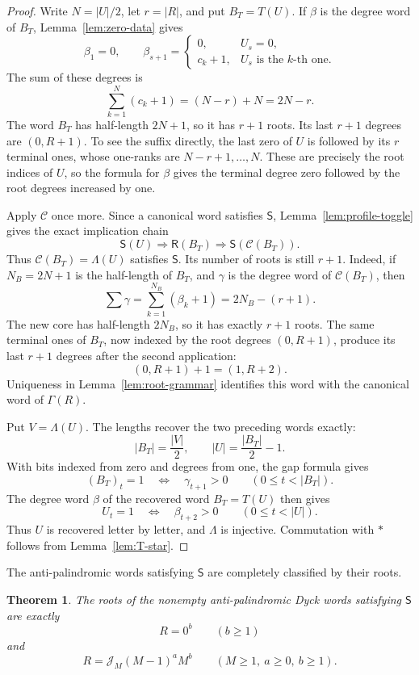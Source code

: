 \documentclass[11pt]{article}
\newtheorem{theorem}{Theorem}[section]
\theoremstyle{definition}
\theoremstyle{remark}
\newcommand{\Star}{*}
\newcommand{\Lam}{\Lambda}
\begin{document}
\begin{proof}
Write \(N=|U|/2\), let \(r=|R|\), and put \(B_T=T(U)\).  If
\(\beta\) is the degree word of \(B_T\), Lemma~\ref{lem:zero-data} gives
\[
 \beta_1=0,
 \qquad
 \beta_{s+1}=
 \begin{cases}
 0,&U_s=0,\\
 c_k+1,&U_s\text{ is the }k\text{-th one}.
 \end{cases}
\]
The sum of these degrees is
\[
 \sum_{k=1}^N(c_k+1)=(N-r)+N=2N-r.
\]
The word \(B_T\) has half-length \(2N+1\), so it has \(r+1\) roots.  Its
last \(r+1\) degrees are \((0,R+1)\).  To see the suffix directly, the last
zero of \(U\) is followed by its \(r\) terminal ones, whose one-ranks are
\(N-r+1,\ldots,N\).  These are precisely the root indices of \(U\), so the
formula for \(\beta\) gives the terminal degree zero followed by the root
degrees increased by one.

Apply \(\mathcal C\) once more.  Since a canonical word satisfies
\(\mathsf S\), Lemma~\ref{lem:profile-toggle} gives the exact implication
chain
\[
 \mathsf S(U)\Longrightarrow\mathsf R(B_T)
 \Longrightarrow\mathsf S(\mathcal C(B_T)).
\]
Thus \(\mathcal C(B_T)=\Lam(U)\) satisfies \(\mathsf S\).  Its number of roots is
still \(r+1\).  Indeed, if \(N_B=2N+1\) is the half-length of \(B_T\), and
\(\gamma\) is the degree word of \(\mathcal C(B_T)\), then
\[
 \sum\gamma=\sum_{k=1}^{N_B}(\beta_k+1)=2N_B-(r+1).
\]
The new core has half-length \(2N_B\), so it has exactly \(r+1\) roots.
The same terminal ones of \(B_T\), now indexed by the root degrees
\((0,R+1)\), produce its last \(r+1\) degrees after the second application:
\[
 (0,R+1)+1=(1,R+2).
\]
Uniqueness in Lemma~\ref{lem:root-grammar} identifies this word with the
canonical word of \(\Gamma(R)\).

Put \(V=\Lam(U)\).  The lengths recover the two preceding words exactly:
\[
 |B_T|=\frac{|V|}{2},
 \qquad
 |U|=\frac{|B_T|}{2}-1.
\]
With bits indexed from zero and degrees from one, the gap formula gives
\[
 (B_T)_t=1\quad\Longleftrightarrow\quad\gamma_{t+1}>0
 \qquad(0\leq t<|B_T|).
\]
The degree word \(\beta\) of the recovered word \(B_T=T(U)\) then gives
\[
 U_t=1\quad\Longleftrightarrow\quad\beta_{t+2}>0
 \qquad(0\leq t<|U|).
\]
Thus \(U\) is recovered letter by letter, and \(\Lam\) is injective.
Commutation with \(\Star\) follows from Lemma~\ref{lem:T-star}.
\end{proof}

The anti-palindromic words satisfying $\mathsf S$ are completely classified by their roots.
\begin{theorem}
\label{thm:root-classification}
The roots of the nonempty anti-palindromic Dyck words satisfying
\(\mathsf S\) are exactly
\begin{equation*}
 R=0^b\qquad(b\geq1)
\end{equation*}
and
\begin{equation}
\label{eq:classified-root-positive}
 R=\mathcal J_M(M-1)^aM^b
 \qquad(M\geq1,\ a\geq0,\ b\geq1).
\end{equation}
\end{theorem}
\end{document}
